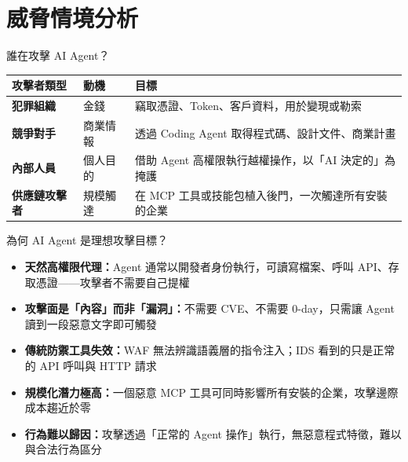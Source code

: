 \documentclass[aspectratio=1610]{Common/MyCourseBeamer}
\begin{document}
\section{威脅情境分析}


\begin{frame}{誰在攻擊 AI Agent？}

	{\small\renewcommand{\arraystretch}{1.3}
	\begin{tabularx}{\linewidth}{p{2.2cm}p{2.0cm}X}
		\toprule
		攻擊者類型 & 動機 & 目標 \\
		\midrule
		\textbf{犯罪組織} & 金錢 & 竊取憑證、Token、客戶資料，用於變現或勒索 \\
		\midrule
		\textbf{競爭對手} & 商業情報 & 透過 Coding Agent 取得程式碼、設計文件、商業計畫 \\
		\midrule
		\textbf{內部人員} & 個人目的 & 借助 Agent 高權限執行越權操作，以「AI 決定的」為掩護 \\
		\midrule
		\textbf{供應鏈攻擊者} & 規模觸達 & 在 MCP 工具或技能包植入後門，一次觸達所有安裝的企業 \\
		\bottomrule
	\end{tabularx}
	}

\end{frame}


\begin{frame}{為何 AI Agent 是理想攻擊目標？}

	\begin{itemize}
		\item \textbf{天然高權限代理：}Agent 通常以開發者身份執行，可讀寫檔案、呼叫 API、存取憑證——攻擊者不需要自己提權

		\item \textbf{攻擊面是「內容」而非「漏洞」：}不需要 CVE、不需要 0-day，只需讓 Agent 讀到一段惡意文字即可觸發

		\item \textbf{傳統防禦工具失效：}WAF 無法辨識語義層的指令注入；IDS 看到的只是正常的 API 呼叫與 HTTP 請求

		\item \textbf{規模化潛力極高：}一個惡意 MCP 工具可同時影響所有安裝的企業，攻擊邊際成本趨近於零

		\item \textbf{行為難以歸因：}攻擊透過「正常的 Agent 操作」執行，無惡意程式特徵，難以與合法行為區分
	\end{itemize}

\end{frame}
\end{document}
